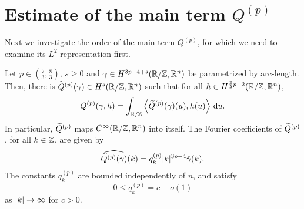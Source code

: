 \section{Estimate of the main term $Q^{(p)}$}
\label{sec:EstimateMainTerm}

Next we investigate the order of the main term $Q^{(p)}$, for which we need to examine its $L^2$-representation first.

\begin{lemma}
    \label{lemma:L2MainTermViaFourier}
    Let $p \in (\tfrac 7 3,\tfrac 8 3)$, $s \ge 0$ and $\gamma \in H^{3p-4+s}(\mathbb{R}/\mathbb{Z},\mathbb{R}^n)$ be parametrized by arc-length.
    Then, there is $\widetilde Q^{(p)}(\gamma) \in H^s(\mathbb{R}/\mathbb{Z},\mathbb{R}^n)$ such that for all $h \in H^{\frac 3 2 p -2}(\mathbb{R}/\mathbb{Z},\mathbb{R}^n)$,
    \[
        Q^{(p)}(\gamma,h) = \int_{\mathbb{R}/\mathbb{Z}} \left<\widetilde Q^{(p)}(\gamma)(u), h(u)\right> \,\mathrm{d} u.
    \]
    In particular, $\widetilde Q^{(p)}$ maps $C^\infty(\mathbb{R}/\mathbb{Z},\mathbb{R}^n)$ into itself.
    The Fourier coefficients of $\widetilde Q^{(p)}$, for all $k\in \mathbb{Z}$, are given by
    \begin{align*}\label{eq:fouriercoeffQ}
        \widehat{\widetilde Q^{(p)}(\gamma)}(k) = q_k^{(p)} \lvert k\rvert^{3p-4} \hat{\gamma} (k).
    \end{align*}
    The constants $q_k^{(p)}$ are bounded independently of $n$, and satisfy 
    \[
        0 \leq q_k^{(p)} = c + o(1)
    \]
    as $\lvert k\rvert \rightarrow \infty$ for $c>0$.
\end{lemma}

